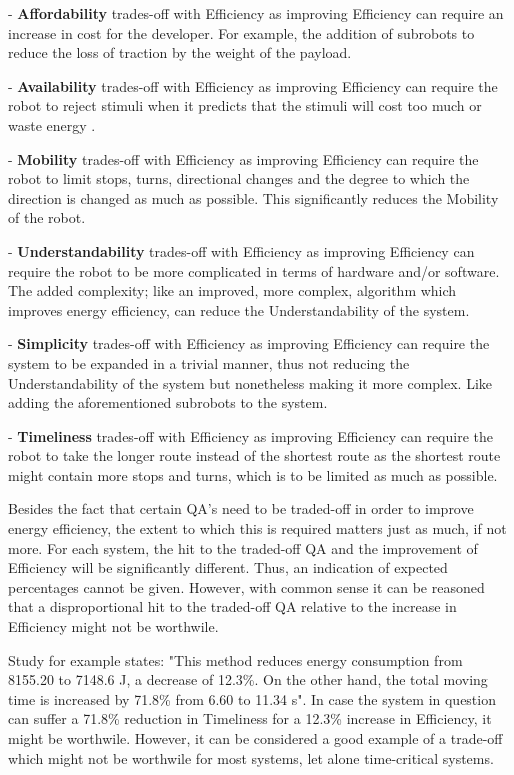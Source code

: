 - \textbf{Affordability} trades-off with Efficiency as improving Efficiency can require an increase in cost for the developer.
For example, the addition of subrobots to reduce the loss of traction by the weight of the payload.

- \textbf{Availability} trades-off with Efficiency as improving Efficiency can require the robot to reject stimuli when it predicts
that the stimuli will cost too much or waste energy \cite{kirtay2013humanoid_emotion}.

- \textbf{Mobility} trades-off with Efficiency as improving Efficiency can require the robot to limit stops, turns, directional changes and the degree 
to which the direction is changed as much as possible. This significantly reduces the Mobility of the robot.

- \textbf{Understandability} trades-off with Efficiency as improving Efficiency can require the robot to be more complicated in terms of hardware
and/or software. 
The added complexity; like an improved, more complex, algorithm which improves energy efficiency, can reduce the Understandability of the system.

- \textbf{Simplicity} trades-off with Efficiency as improving Efficiency can require the system to be expanded in a trivial manner, thus not
reducing the Understandability of the system but nonetheless making it more complex. Like adding the aforementioned subrobots to the system.

- \textbf{Timeliness} trades-off with Efficiency as improving Efficiency can require the robot to take the longer route instead of the shortest route
as the shortest route might contain more stops and turns, which is to be limited as much as possible.

\vspace{5mm}

Besides the fact that certain QA's need to be traded-off in order to improve energy efficiency, the extent to which this is required 
matters just as much, if not more.
For each system, the hit to the traded-off QA and the improvement of Efficiency will be significantly different.
Thus, an indication of expected percentages cannot be given.
However, with common sense it can be reasoned that a disproportional hit to the traded-off QA relative to the increase in Efficiency might not be worthwile.

Study \cite{kaitwanidvilai2020industrial_robot_cycle_time} for example states: "This method reduces energy consumption from 8155.20 to 7148.6 J, 
a decrease of 12.3\%.  On the other hand, the total moving time is increased by 71.8\% from 6.60 to 11.34 s". 
In case the system in question can suffer a 71.8\% reduction in Timeliness for a 12.3\% increase in Efficiency, it might be worthwile.
However, it can be considered a good example of a trade-off which might not be worthwile for most systems, let alone time-critical systems.

